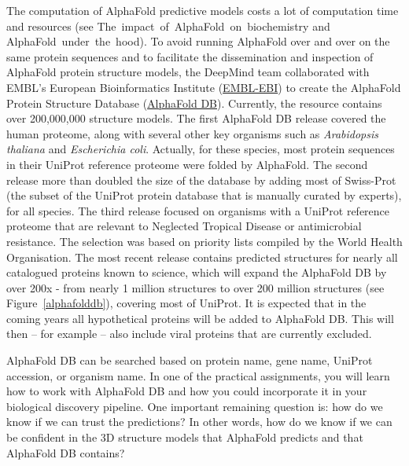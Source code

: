 The computation of AlphaFold predictive models costs a lot of computation time and resources (see The~impact~of~AlphaFold~on~biochemistry and AlphaFold~under~the~hood).
To avoid running AlphaFold over and over on the same protein sequences and to facilitate the dissemination and inspection of AlphaFold protein structure models, the DeepMind team collaborated with EMBL's European Bioinformatics Institute (\href{https://www.ebi.ac.uk/}{EMBL-EBI}) to create the AlphaFold Protein Structure Database (\href{https://alphafold.ebi.ac.uk/}{AlphaFold DB}).
Currently, the resource contains over 200,000,000 structure models.
The first AlphaFold DB release covered the human proteome, along with several other key organisms such as \textit{Arabidopsis thaliana} and \textit{Escherichia coli}.
Actually, for these species, most protein sequences in their UniProt reference proteome were folded by AlphaFold.
The second release more than doubled the size of the database by adding most of Swiss-Prot (the subset of the UniProt protein database that is manually curated by experts), for all species.
The third release focused on organisms with a UniProt reference proteome that are relevant to Neglected Tropical Disease or antimicrobial resistance.
The selection was based on priority lists compiled by the World Health Organisation.
The most recent release contains predicted structures for nearly all catalogued proteins known to science, which will expand the AlphaFold DB by over 200x - from nearly 1 million structures to over 200 million structures (see Figure~\ref{alphafolddb}), covering most of UniProt.
It is expected that in the coming years all hypothetical proteins will be added to AlphaFold DB.
This will then -- for example -- also include viral proteins that are currently excluded.

AlphaFold DB can be searched based on protein name, gene name, UniProt accession, or organism name.
In one of the practical assignments, you will learn how to work with AlphaFold DB and how you could incorporate it in your biological discovery pipeline.
One important remaining question is: how do we know if we can trust the predictions?
In other words, how do we know if we can be confident in the 3D structure models that AlphaFold predicts and that AlphaFold DB contains?

